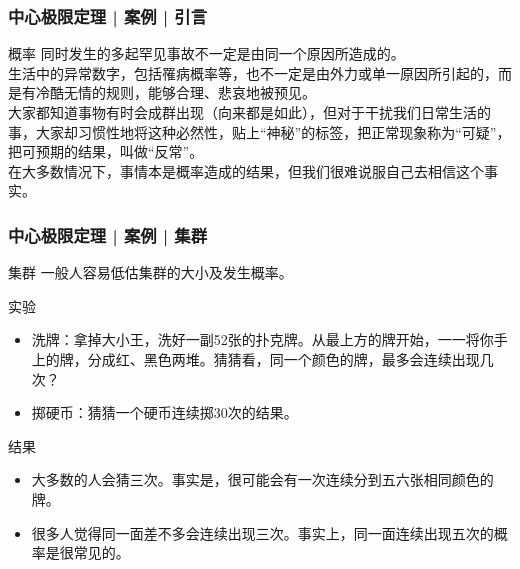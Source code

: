 \begin{frame}
  \frametitle{中心极限定理 | 案例 | 引言}
  \begin{block}{概率}
    同时发生的多起罕见事故不一定是由同一个原因所造成的。\\
    \vspace{0.5em}
    生活中的异常数字，包括罹病概率等，也不一定是由外力或单一原因所引起的，而是有冷酷无情的规则，能够合理、悲哀地被预见。\\
    \vspace{0.5em}
大家都知道事物有时会成群出现（向来都是如此），但对于干扰我们日常生活的事，大家却习惯性地将这种必然性，贴上“神秘”的标签，把正常现象称为“可疑”，把可预期的结果，叫做“反常”。\\
    \vspace{0.5em}
    在大多数情况下，事情本是概率造成的结果，但我们很难说服自己去相信这个事实。
  \end{block}
\end{frame}

\begin{frame}
  \frametitle{中心极限定理 | 案例 | 集群}
  \begin{block}{集群}
    一般人容易低估集群的大小及发生概率。
  \end{block}
  \pause
  \begin{block}{实验}
    \begin{itemize}
      \item 洗牌：拿掉大小王，洗好一副52张的扑克牌。从最上方的牌开始，一一将你手上的牌，分成红、黑色两堆。猜猜看，同一个颜色的牌，最多会连续出现几次？
      \item 掷硬币：猜猜一个硬币连续掷30次的结果。
    \end{itemize}
  \end{block}
  \pause \pause \pause \pause
  \begin{block}{结果}
    \begin{itemize}
      \item 大多数的人会猜三次。事实是，很可能会有一次连续分到五六张相同颜色的牌。
      \item 很多人觉得同一面差不多会连续出现三次。事实上，同一面连续出现五次的概率是很常见的。
    \end{itemize}
  \end{block}
\end{frame}

